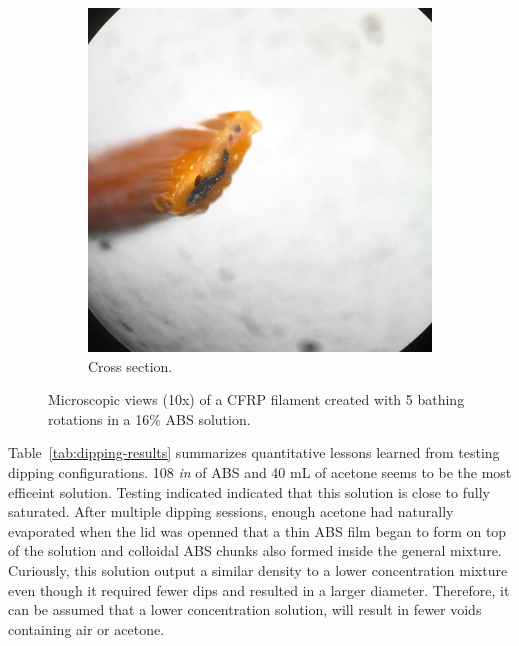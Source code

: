 \begin{figure}[h!]
\begin{subfigure}[b]{0.3\textwidth}
                \includegraphics[width=\textwidth]{./figures/filament-108-40-flat-end}
                \caption{Cross section.}
                \label{fig:filament-108-40-flat-end}
        \end{subfigure}
        \caption{Microscopic views (10x) of a CFRP filament created with 5 bathing rotations in a 16\% ABS solution.}\label{fig:filament-108-40-bath-microscope}
\end{figure}



Table~\ref{tab:dipping-results} summarizes quantitative lessons learned from testing dipping configurations. 108 \emph{in} of ABS and 40 {mL} of acetone seems to be the most efficeint solution. Testing indicated indicated that this solution is close to fully saturated. After multiple dipping sessions, enough acetone had naturally evaporated when the lid was openned that a thin ABS film began to form on top of the solution and colloidal ABS chunks also formed inside the general mixture. Curiously, this solution output a similar density to a lower concentration mixture even though it required fewer dips and resulted in a larger diameter. Therefore, it can be assumed that a lower concentration solution, will result in fewer voids containing air or acetone.\\

